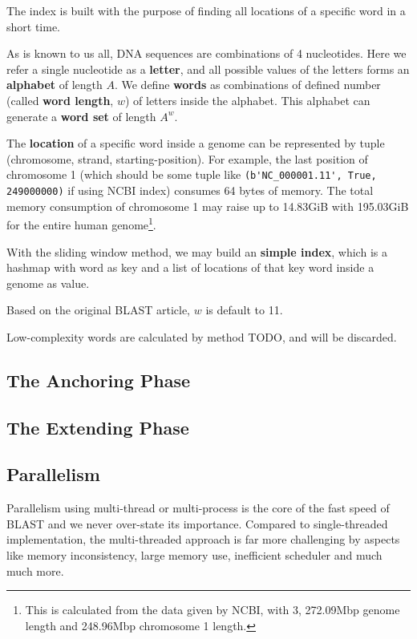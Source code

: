 \documentclass[9pt,final,journal,twocolumn,a4paper]{IEEEtran}
\begin{document}
The index is built with the purpose of finding all locations of a specific word in a short time.

As is known to us all, DNA sequences are combinations of 4 nucleotides. Here we refer a single nucleotide as a \textbf{letter}, and all possible values of the letters forms an \textbf{alphabet} of length $A$. We define \textbf{words} as combinations of defined number (called \textbf{word length}, $w$) of letters inside the alphabet. This alphabet can generate a \textbf{word set} of length $A^{w}$.

The \textbf{location} of a specific word inside a genome can be represented by tuple (chromosome, strand, starting-position). For example, the last position of chromosome 1 (which should be some tuple like \verb|(b'NC_000001.11', True, 249000000)| if using NCBI index) consumes 64 bytes of memory. The total memory consumption of chromosome 1 may raise up to 14.83GiB with 195.03GiB for the entire human genome\footnote{This is calculated from the data given by NCBI, with 3, 272.09Mbp genome length and 248.96Mbp chromosome 1 length.}.

With the sliding window method, we may build an  \textbf{simple index}, which is a hashmap with word as key and a list of locations of that key word inside a genome as value.

Based on the original BLAST article, $w$ is default to 11.

Low-complexity words are calculated by method TODO, and will be discarded.

\subsection{The \textbf{Anchoring} Phase}

\subsection{The \textbf{Extending} Phase}

\subsection{Parallelism}

Parallelism using multi-thread or multi-process is the core of the fast speed of BLAST and we never over-state its importance. Compared to single-threaded implementation, the multi-threaded approach is far more challenging by aspects like memory inconsistency, large memory use, inefficient scheduler and much much more.
\end{document}
